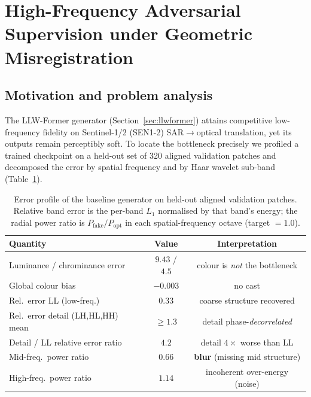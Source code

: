 %

\section{High-Frequency Adversarial Supervision under Geometric Misregistration}
\label{sec:hfd}

\subsection{Motivation and problem analysis}
\label{sec:hfd:motivation}

The LLW-Former generator (Section~\ref{sec:llwformer}) attains competitive low-frequency
fidelity on Sentinel-1/2 (SEN1-2) SAR$\rightarrow$optical translation, yet its outputs remain
perceptibly soft. To locate the bottleneck precisely we profiled a trained checkpoint on a
held-out set of \num{320} aligned validation patches and decomposed the error by spatial
frequency and by Haar wavelet sub-band (Table~\ref{tab:errorprofile}).

\begin{table}[t]
\centering
\caption{Error profile of the baseline generator on held-out aligned validation patches.
Relative band error is the per-band $L_1$ normalised by that band's energy; the radial power
ratio is $P_\text{fake}/P_\text{opt}$ in each spatial-frequency octave (target $=1.0$).}
\label{tab:errorprofile}
\begin{tabular}{lcc}
\toprule
Quantity & Value & Interpretation \\
\midrule
Luminance / chrominance error & $9.43$ / $4.5$ & colour is \emph{not} the bottleneck \\
Global colour bias & $-0.003$ & no cast \\
Rel.\ error LL (low-freq.) & $0.33$ & coarse structure recovered \\
Rel.\ error detail (LH,HL,HH) mean & $\geq 1.3$ & detail phase-\emph{decorrelated} \\
Detail / LL relative error ratio & $4.2$ & detail $4\times$ worse than LL \\
Mid-freq.\ power ratio & $0.66$ & \textbf{blur} (missing mid structure) \\
High-freq.\ power ratio & $1.14$ & incoherent over-energy (noise) \\
\bottomrule
\end{tabular}
\end{table}

